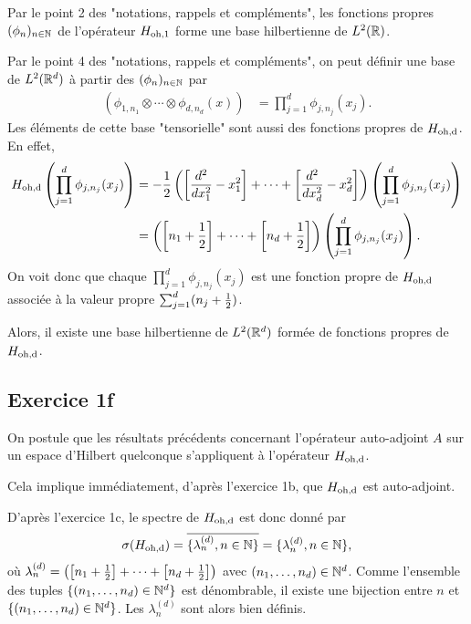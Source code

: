 Par le point 2 des "notations, rappels et compléments", les
fonctions propres $(\phi_n)_{n \in \mathbb{N}}$ de l'opérateur $H_\text{oh,1}$
forme une base hilbertienne de $L^2(\mathbb{R})$.

Par le point 4 des "notations, rappels et compléments", on peut
définir une base de $L^2(\mathbb{R}^d)$ à partir des
$(\phi_n)_{n \in \mathbb{N}}$ par
\begin{align}
    (\phi_{1, n_1} \otimes \cdots \otimes \phi_{d, n_d}(x))
    &= \prod_{j=1}^d \phi_{j, n_j}(x_j).
\end{align}
%
Les éléments de cette base "tensorielle" sont aussi des
fonctions propres de $H_\text{oh,d}$. En effet,
\begin{align}
    \hod \left( \prod_{j=1}^d \phi_{j, n_j}(x_j) \right)
    &= -\ud \left( \left[ \dd{x_1} - x_1^2 \right] + \cdots
       + \left[ \dd{x_d} - x_d^2 \right] \right)
    \left( \prod_{j=1}^d \phi_{j, n_j}(x_j) \right) \\
%
    &= \left( \left[ n_1 + \ud \right] + \cdots
    + \left[ n_d + \ud \right] \right)
    \left( \prod_{j=1}^d \phi_{j, n_j}(x_j) \right).
\end{align}
%
On voit donc que chaque $\prod_{j=1}^d \phi_{j, n_j}(x_j)$
est une fonction propre de $H_\text{oh,d}$ associée à la
valeur propre $\sum_{j=1}^d (n_j + \frac{1}{2})$.

Alors, il existe une base hilbertienne de $L^2(\mathbb{R}^d)$
formée de fonctions propres de $H_\text{oh,d}$.


\subsection*{Exercice 1f}

On postule que les résultats précédents concernant l'opérateur
auto-adjoint $A$ sur un espace d'Hilbert quelconque s'appliquent
à l'opérateur $H_\text{oh,d}$.

Cela implique immédiatement, d'après l'exercice 1b, que
$H_\text{oh,d}$ est auto-adjoint.

D'après l'exercice 1c, le spectre de $H_\text{oh,d}$ est donc donné par
\begin{align}
    \sigma{(H_\text{oh,d})} = \overline{ \{ \lambda_n^{(d)}, {n \in \mathbb{N}} \} }
    = \{ \lambda_n^{(d)}, {n \in \mathbb{N}} \},
\end{align}
%
où $\lambda_n^{(d)} = \left( \left[ n_1 + \frac{1}{2} \right] + \cdots
+ \left[ n_d + \frac{1}{2} \right] \right)$ avec $(n_1, \dots, n_d) \in \mathbb{N}^d$.
Comme l'ensemble des tuples
$\{(n_1, \dots, n_d)\in \mathbb{N}^d \}$ est dénombrable, il existe une
bijection entre $n$ et $\{(n_1, \dots, n_d)\in \mathbb{N}^d\}$. Les
$\lambda_n^{(d)}$ sont alors bien définis.

